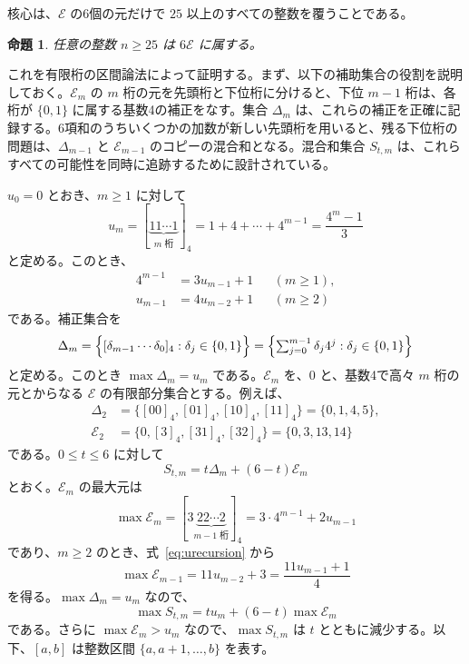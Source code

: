 \documentclass[12pt]{ltjsarticle}
\theoremstyle{plain}
\newtheorem{proposition}[theorem]{命題}
\theoremstyle{definition}
\theoremstyle{plain}
\begin{document}
核心は、$\mathcal E$ の6個の元だけで $25$ 以上のすべての整数を覆うことである。

\begin{proposition}\label{prop:E}
任意の整数 $n\geq25$ は $6\mathcal E$ に属する。
\end{proposition}

これを有限桁の区間論法によって証明する。まず、以下の補助集合の役割を説明しておく。$\mathcal E_m$ の $m$ 桁の元を先頭桁と下位桁に分けると、下位 $m-1$ 桁は、各桁が $\{0,1\}$ に属する基数4の補正をなす。集合 $\Delta_m$ は、これらの補正を正確に記録する。6項和のうちいくつかの加数が新しい先頭桁を用いると、残る下位桁の問題は、$\Delta_{m-1}$ と $\mathcal E_{m-1}$ のコピーの混合和となる。混合和集合 $S_{t,m}$ は、これらすべての可能性を同時に追跡するために設計されている。

$u_0=0$ とおき、$m\geq1$ に対して
\begin{equation}\label{eq:umdef}
 u_m=[\underbrace{11\cdots1}_{m\text{ 桁}}]_4
    =1+4+\cdots+4^{m-1}=\frac{4^m-1}{3}
\end{equation}
と定める。このとき、
\begin{equation}\label{eq:urecursion}
\begin{aligned}
 4^{m-1}&=3u_{m-1}+1 &&(m\geq1),\\
 u_{m-1}&=4u_{m-2}+1 &&(m\geq2)
\end{aligned}
\end{equation}
である。補正集合を
\[
 \Delta_m=\Bigl\{[\delta_{m-1}\cdots\delta_0]_4:\delta_j\in\{0,1\}\Bigr\}
    =\Bigl\{\textstyle\sum_{j=0}^{m-1}\delta_j4^j:\delta_j\in\{0,1\}\Bigr\}
\]
と定める。このとき $\max \Delta_m=u_m$ である。$\mathcal E_m$ を、$0$ と、基数4で高々 $m$ 桁の元とからなる $\mathcal E$ の有限部分集合とする。例えば、
\[
\begin{aligned}
 \Delta_2&=\{[00]_4,[01]_4,[10]_4,[11]_4\}=\{0,1,4,5\},\\
 \mathcal E_2&=\{0,[3]_4,[31]_4,[32]_4\}=\{0,3,13,14\}
\end{aligned}
\]
である。$0\leq t\leq6$ に対して
\begin{equation}\label{eq:S-t-m}
 S_{t,m}=t\Delta_m+(6-t)\mathcal E_m
\end{equation}
とおく。$\mathcal E_m$ の最大元は
\[
 \max\mathcal E_m=[3\underbrace{22\cdots2}_{m-1\text{ 桁}}]_4
                =3\cdot4^{m-1}+2u_{m-1}
\]
であり、$m\geq2$ のとき、式~\eqref{eq:urecursion} から
\begin{equation}\label{eq:maxErecursion}
 \max\mathcal E_{m-1}=11u_{m-2}+3=\frac{11u_{m-1}+1}{4}
\end{equation}
を得る。$\max \Delta_m=u_m$ なので、
\begin{equation}\label{eq:maxStm}
 \max S_{t,m}=tu_m+(6-t)\max\mathcal E_m
\end{equation}
である。さらに $\max\mathcal E_m>u_m$ なので、$\max S_{t,m}$ は $t$ とともに減少する。以下、$[a,b]$ は整数区間 $\{a,a+1,\ldots,b\}$ を表す。
\end{document}
